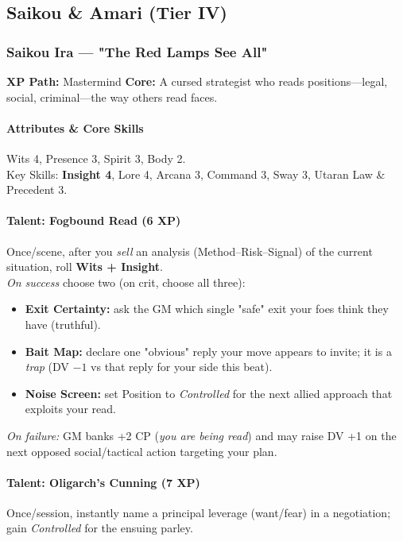 

\subsection{Saikou \& Amari (Tier IV)}

\subsubsection{Saikou Ira — "The Red Lamps See All"}
\textbf{XP Path:} Mastermind \quad
\textbf{Core:} A cursed strategist who reads positions—legal, social, criminal—the way others read faces.

\paragraph{Attributes \& Core Skills}
Wits 4, Presence 3, Spirit 3, Body 2.\\
Key Skills: \textbf{Insight 4}, Lore 4, Arcana 3, Command 3, Sway 3, Utaran Law \& Precedent 3.

\paragraph{Talent: Fogbound Read (6 XP)}
Once/scene, after you \emph{sell} an analysis (Method–Risk–Signal) of the current situation, roll \textbf{Wits + Insight}.\\
\emph{On success} choose two (on crit, choose all three):
\begin{itemize}
  \item \textbf{Exit Certainty:} ask the GM which single "safe" exit your foes think they have (truthful).
  \item \textbf{Bait Map:} declare one "obvious" reply your move appears to invite; it is a \emph{trap} (DV $-1$ vs that reply for your side this beat).
  \item \textbf{Noise Screen:} set Position to \emph{Controlled} for the next allied approach that exploits your read.
\end{itemize}
\emph{On failure:} GM banks +2 CP (\emph{you are being read}) and may raise DV +1 on the next opposed social/tactical action targeting your plan.

\paragraph{Talent: Oligarch's Cunning (7 XP)}
Once/session, instantly name a principal leverage (want/fear) in a negotiation; gain \emph{Controlled} for the ensuing parley.

